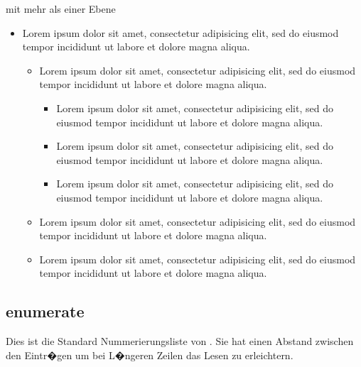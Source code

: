 mit mehr als einer Ebene

\begin{itemize}
   \item Lorem ipsum dolor sit amet, consectetur adipisicing elit, sed do eiusmod tempor incididunt ut labore et dolore magna aliqua.
%
   \begin{itemize}
      \item Lorem ipsum dolor sit amet, consectetur adipisicing elit, sed do eiusmod tempor incididunt ut labore et dolore magna aliqua.
      \begin{itemize}
         \item Lorem ipsum dolor sit amet, consectetur adipisicing elit, sed do eiusmod tempor incididunt ut labore et dolore magna aliqua.
         \item Lorem ipsum dolor sit amet, consectetur adipisicing elit, sed do eiusmod tempor incididunt ut labore et dolore magna aliqua.
         \item Lorem ipsum dolor sit amet, consectetur adipisicing elit, sed do eiusmod tempor incididunt ut labore et dolore magna aliqua.
      \end{itemize}
      \item Lorem ipsum dolor sit amet, consectetur adipisicing elit, sed do eiusmod tempor incididunt ut labore et dolore magna aliqua.
      \item Lorem ipsum dolor sit amet, consectetur adipisicing elit, sed do eiusmod tempor incididunt ut labore et dolore magna aliqua.
   \end{itemize}
\end{itemize}

\subsection{enumerate}
Dies ist die Standard Nummerierungsliste von \LaTeXe{}. Sie hat einen Abstand zwischen den Eintr�gen um bei L�ngeren Zeilen das Lesen zu erleichtern.

